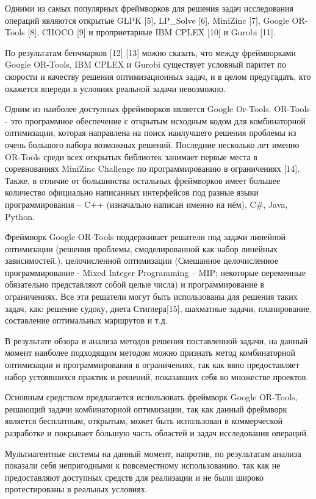 Одними из самых популярных фреймворков для решения задач исследования операций являются открытые GLPK [5], LP\_Solve [6], MiniZinc [7], Google OR-Tools [8], CHOCO [9] и проприетарные IBM CPLEX [10] и Gurobi [11].

По результатам бенчмарков [12] [13] можно сказать, что между фреймворками Google OR-Tools, IBM CPLEX и Gurobi существует условный паритет по скорости и качеству решения оптимизационных задач, и в целом предугадать, кто окажется впереди в условиях реальной задачи невозможно.

Одним из наиболее доступных фреймворков является Google Or-Tools. OR-Tools - это программное обеспечение с открытым исходным кодом для комбинаторной оптимизации, которая направлена на поиск наилучшего решения проблемы из очень большого набора возможных решений. Последние несколько лет именно OR-Tools среди всех открытых библиотек занимает первые места в соревнованиях MiniZinc Challenge по программированию в ограничениях [14]. Также, в отличие от большинства остальных фреймворков имеет большее количество официально написанных интерфейсов под разные языки программирования – C++ (изначально написан именно на нём), C\#, Java, Python.

Фреймворк Google OR-Tools поддерживает решатели под задачи линейной оптимизации (решения проблемы, смоделированной как набор линейных зависимостей.), целочисленной оптимизации (Смешанное целочисленное программирование - Mixed Integer Programming – MIP; некоторые переменные обязательно представляют собой целые числа) и программирование в ограничениях. Все эти решатели могут быть использованы для решения таких задач, как: решение судоку, диета Стиглера[15], шахматные задачи, планирование, составление оптимальных маршрутов и т.д.

В результате обзора и анализа методов решения поставленной задачи, на данный момент наиболее подходящим методом можно признать метод комбинаторной оптимизации и программирования в ограничениях, так как явно предоставляет набор устоявшихся практик и решений, показавших себя во множестве проектов.

Основным средством предлагается использовать фреймворк Google OR-Tools, решающий задачи комбинаторной оптимизации, так как данный фреймворк является бесплатным, открытым, может быть использован в коммерческой разработке и покрывает большую часть областей и задач исследования операций.

Мультиагентные системы на данный момент, напротив, по результатам анализа показали себя непригодными к повсеместному использованию, так как не предоставляют доступных средств для реализации и не были широко протестированы в реальных условиях.


